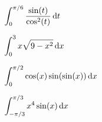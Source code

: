 \documentclass[10pt]{amsart}
\begin{document}
\vspace{2in}

\begin{multicols}{2}
  \begin{thm}
    \(\displaystyle{\int_0^{\pi/6} \frac{\sin(t)}{\cos^2(t)}\dif t}\)
  \end{thm}

  \begin{thm}
    \(\displaystyle{\int_0^3 x\sqrt{9 - x^2}\dif x}\)
  \end{thm}
\end{multicols}

\vspace{2in}

\begin{multicols}{2}
  \begin{thm}
    \(\displaystyle{\int_0^{\pi/2} \cos(x) \sin(\sin(x)) \dif x}\)
  \end{thm}

  \begin{thm}
    \(\displaystyle{\int_{-\pi/3}^{\pi/3} x^4\sin(x) \dif x}\)
  \end{thm}
\end{multicols}
\end{document}
